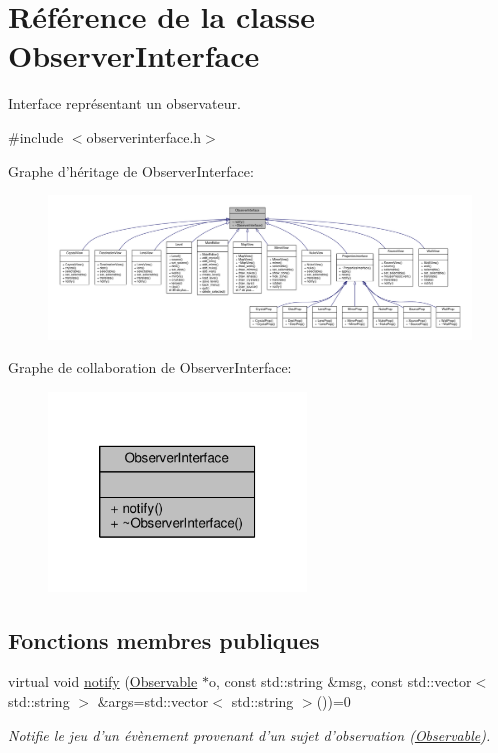 \hypertarget{classObserverInterface}{\section{Référence de la classe Observer\+Interface}
\label{classObserverInterface}
}


Interface représentant un observateur.  




{\ttfamily \#include $<$observerinterface.\+h$>$}



Graphe d'héritage de Observer\+Interface\+:\nopagebreak
\begin{figure}[H]
\begin{center}
\leavevmode
\includegraphics[width=350pt]{d7/d5b/classObserverInterface__inherit__graph}
\end{center}
\end{figure}


Graphe de collaboration de Observer\+Interface\+:\nopagebreak
\begin{figure}[H]
\begin{center}
\leavevmode
\includegraphics[width=194pt]{d9/d44/classObserverInterface__coll__graph}
\end{center}
\end{figure}
\subsection*{Fonctions membres publiques}
\begin{DoxyCompactItemize}
\item 
virtual void \hyperlink{classObserverInterface_a3083639e706557f950f62af8ab283150}{notify} (\hyperlink{classObservable}{Observable} $\ast$o, const std\+::string \&msg, const std\+::vector$<$ std\+::string $>$ \&args=std\+::vector$<$ std\+::string $>$())=0
\begin{DoxyCompactList}\small\item\em Notifie le jeu d'un évènement provenant d'un sujet d'observation (\hyperlink{classObservable}{Observable}). \end{DoxyCompactList}\end{DoxyCompactItemize}


